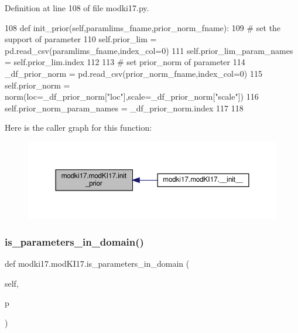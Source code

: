 Definition at line 108 of file modki17.\+py.


\begin{DoxyCode}
108     \textcolor{keyword}{def }init\_prior(self,paramlims\_fname,prior\_norm\_fname):
109         \textcolor{comment}{# set the support of parameter}
110         self.prior\_lim = pd.read\_csv(paramlims\_fname,index\_col=0)
111         self.prior\_lim\_param\_names = self.prior\_lim.index
112         
113         \textcolor{comment}{# set prior\_norm of parameter}
114         \_df\_prior\_norm = pd.read\_csv(prior\_norm\_fname,index\_col=0)
115         self.prior\_norm = norm(loc=\_df\_prior\_norm[\textcolor{stringliteral}{"loc"}],scale=\_df\_prior\_norm[\textcolor{stringliteral}{"scale"}])
116         self.prior\_norm\_param\_names = \_df\_prior\_norm.index
117     
118     
\end{DoxyCode}
Here is the caller graph for this function\+:\nopagebreak
\begin{figure}[H]
\begin{center}
\leavevmode
\includegraphics[width=350pt]{df/da3/classmodki17_1_1modKI17_a4cf4f61966d19271b648997a58979955_icgraph}
\end{center}
\end{figure}
\mbox{\label{classmodki17_1_1modKI17_a649064bb198ade8a8c6c59faeab6c9c4}} 
\subsubsection{\texorpdfstring{is\+\_\+parameters\+\_\+in\+\_\+domain()}{is\_parameters\_in\_domain()}}
{\footnotesize\ttfamily def modki17.\+mod\+K\+I17.\+is\+\_\+parameters\+\_\+in\+\_\+domain (\begin{DoxyParamCaption}\item[{}]{self,  }\item[{}]{p }\end{DoxyParamCaption})}




